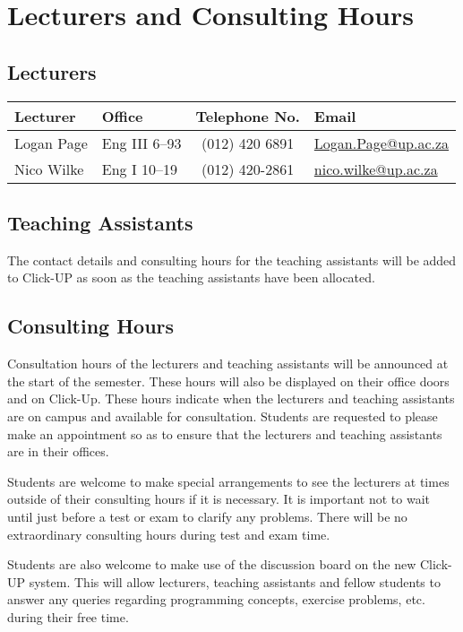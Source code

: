 \section{Lecturers and Consulting Hours}
    \subsection{Lecturers}
        \begin{table}[!h]
            \begin{center}
             \begin{tabular}{|l|l|c|l|}
                 \hline
                 {\bf Lecturer} & {\bf Office} & {\bf Telephone No.} & {\bf Email} \\
                 \hline
                 Logan Page &
                 Eng III 6--93 &
                 (012) 420 6891 &
                 \href{mailto:Logan.Page@up.ac.za}{Logan.Page@up.ac.za} \\
                 Nico Wilke &
                 Eng I 10--19 &
                 (012) 420-2861 &
                 \href{mailto:nico.wilke@up.ac.za}{nico.wilke@up.ac.za} \\
                 \hline
             \end{tabular}
            \end{center}
        \end{table}

    \subsection{Teaching Assistants}
        The contact details and consulting hours for the teaching assistants
        will be added to Click-UP as soon as the teaching assistants have been
        allocated.

    \subsection{Consulting Hours}
        Consultation hours of the lecturers and teaching assistants will be
        announced at the start of the semester. These hours will also be
        displayed on their office doors and on Click-Up. These hours indicate
        when the lecturers and teaching assistants are on campus and available
        for consultation. Students are requested to please make an appointment
        so as to ensure that the lecturers and teaching assistants are in their
        offices.

        Students are welcome to make special arrangements to see the lecturers
        at times outside of their consulting hours if it is necessary. It is
        important not to wait until just before a test or exam to clarify any
        problems. There will be no extraordinary consulting hours during test
        and exam time.

        Students are also welcome to make use of the discussion board on the
        new Click-UP system. This will allow lecturers, teaching assistants
        and fellow students to answer any queries regarding programming
        concepts, exercise problems, etc. during their free time.
